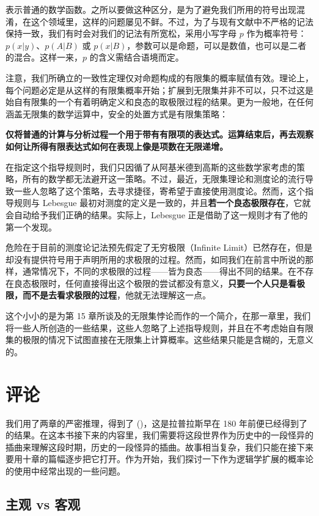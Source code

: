 表示普通的数学函数。之所以要做这种区分，是为了避免我们所用的符号出现混淆，在这个领域里，这样的问题屡见不鲜。不过，为了与现有文献中不严格的记法保持一致，我们有时会对我们的记法有所宽松，采用小写字母 $p$ 作为概率符号：$p(x|y)$、$p(A|B)$ 或 $p(x|B)$，参数可以是命题，可以是数值，也可以是二者的混合。这样一来，$p$ 的含义需结合语境而定。

注意，我们所确立的一致性定理仅对命题构成的有限集的概率赋值有效。理论上，每个问题必定是从这样的有限集概率开始；扩展到无限集并非不可以，只不过这是始自有限集的一个有着明确定义和良态的取极限过程的结果。更为一般地，在任何涵盖无限集的数学运算中，安全的处置方式是有限集策略：

{\bf 仅将普通的计算与分析过程一个用于带有有限项的表达式。运算结束后，再去观察如何让所得有限表达式如何在表现上像是项数在无限递增。}

在指定这个指导规则时，我们只因循了从阿基米德到高斯的这些数学家考虑的策略，所有的数学都无法避开这一策略。不过，最近，无限集理论和测度论的流行导致一些人忽略了这个策略，去寻求捷径，寄希望于直接使用测度论。然而，这个指导规则与 Lebesgue 最初对测度的定义是一致的，并且{\bf 若一个良态极限存在}，它就会自动给予我们正确的结果。实际上，Lebesgue 正是借助了这一规则才有了他的第一个发现。

危险在于目前的测度论记法预先假定了无穷极限（Infinite Limit）已然存在，但是却没有提供符号用于声明所用的求极限的过程。然而，如同我们在前言中所说的那样，通常情况下，不同的求极限的过程——皆为良态——得出不同的结果。在不存在良态极限时，任何直接得出这个极限的尝试都没有意义，{\bf 只要一个人只是看极限，而不是去看求极限的过程}，他就无法理解这一点。

这个小小的是为第 15 章所谈及的无限集悖论而作的一个简介，在那一章里，我们将一些人所创造的一些结果，这些人忽略了上述指导规则，并且在不考虑始自有限集的极限的情况下试图直接在无限集上计算概率。这些结果只能是含糊的，无意义的。

\section{评论}

我们用了两章的严密推理，得到了 (\in[2-99])，这是拉普拉斯早在 180 年前便已经得到了的结果。在这本书接下来的内容里，我们需要将这段世界作为历史中的一段怪异的插曲来理解这段时期，历史的一段怪异的插曲。故事相当复杂，我们只能在接下来要用十章的篇幅逐步把它打开。作为开始，我们探讨一下作为逻辑学扩展的概率论的使用中经常出现的一些问题。

\subsection{主观 vs 客观}

